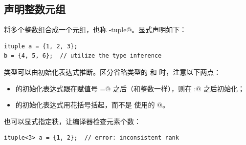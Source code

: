 \subsection*{声明整数元组}

\co@ituple@ 将多个整数组合成一个元组，也称 \co@i-tuple@。显式声明如下：

\begin{lstlisting}[language=croqtile,caption={i-tuple 字面量}]
ituple a = {1, 2, 3};
b = {4, 5, 6};  // utilize the type inference
\end{lstlisting}

类型可以由初始化表达式推断。区分省略类型的 \co@ituple@ 和 \co@mdspan@ 时，注意以下两点：

\begin{itemize}[leftmargin=1.6em]
\item \co@ituple@ 的初始化表达式跟在赋值号 \co@=@ 之后（和整数一样），\co@mdspan@ 则在 \co@:@ 之后初始化；
\item \co@ituple@ 的初始化表达式用花括号括起，而不是 \co@mdspan@ 使用的 \co@[]@。
\end{itemize}

也可以显式指定秩，让编译器检查元素个数：

\begin{lstlisting}[language=croqtile,caption={秩不一致}]
ituple<3> a = {1, 2};  // error: inconsistent rank
\end{lstlisting}
